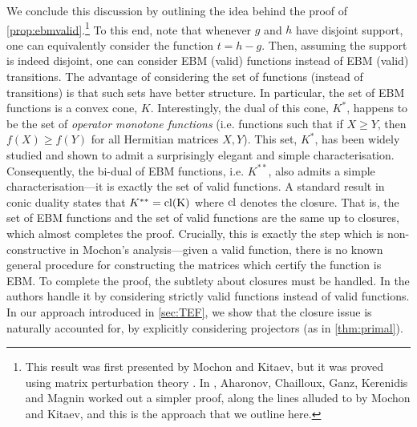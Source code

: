 \documentclass{article}
\begin{document}
We conclude this discussion by outlining the idea behind the proof of \cref{prop:ebmvalid}.\footnote{This result was first presented by Mochon and Kitaev, but it was proved using matrix perturbation theory \cite{Mochon07}. In \cite{ACG+14}, Aharonov, Chailloux,  Ganz,  Kerenidis and Magnin worked out a simpler proof, along the lines alluded to by  Mochon and  Kitaev, and this is the approach that we outline here.}
To this end, note that whenever $g$ and $h$ have disjoint support, one can equivalently consider the function $t=h-g$. Then, assuming the support is indeed disjoint, one can consider EBM (valid) functions instead of EBM (valid) transitions. The advantage of considering the set of functions (instead of transitions) is that such sets have better structure. In particular, the set of EBM functions is a convex cone, $K$. Interestingly, the dual of this cone, $K^*$, happens to be the set of \emph{operator monotone functions} (i.e. functions such that if $X\ge Y$, then $f(X) \ge f(Y)$ for all Hermitian matrices $X,Y$). %
This set, $K^*$, has been widely studied and shown to admit a surprisingly elegant and simple characterisation. Consequently, the bi-dual of EBM functions, i.e. $K^{**}$, also admits a simple characterisation---it is exactly the set of valid functions. A standard result in conic duality \cite{Boyd2004} states that $K^{**}=\rm{cl}(K)$ where $\rm{cl}$ denotes the closure. That is, the set of EBM functions and the set of valid functions are the same up to closures, which almost completes the proof. Crucially, this is exactly the step which is non-constructive in Mochon's analysis---given a valid function, there is no known general procedure for constructing the matrices which certify the function is EBM. To complete the proof, the subtlety about closures must be handled. In \cite{ACG+14} the authors handle it by considering strictly valid functions instead of valid functions. In our approach introduced in \cref{sec:TEF}, we show that the closure issue is naturally accounted for, by explicitly considering projectors (as in \cref{thm:primal}).
%
%


%

%
%
%
%
%
%
%
%
%
%
%
%
%
%
%
%
%


%
%
%
%
%
%
%
%
%

%


%
%
%
%
%
%
%


%
%
%
%
%
%
%
%
%
%

%

%
%
%
%
%
%
%
%
\end{document}

